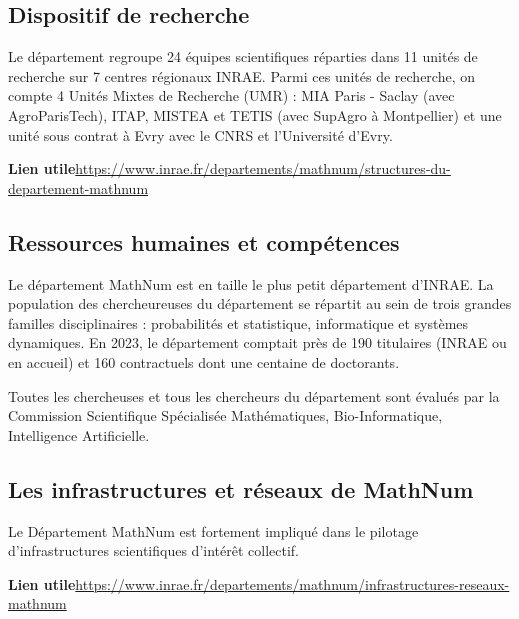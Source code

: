 \subsection{Dispositif de recherche}

Le d\'epartement regroupe 24 \'equipes scientifiques r\'eparties dans 11 unit\'es de recherche sur 7 centres r\'egionaux INRAE. Parmi ces unit\'es de recherche, on compte 4 Unit\'es Mixtes de Recherche (UMR) : MIA Paris - Saclay (avec AgroParisTech), ITAP, MISTEA et TETIS (avec SupAgro \`a Montpellier) et une unit\'e sous contrat \`a Evry avec le CNRS et l'Universit\'e d'Evry.

\textbf{Lien utile\hspace{.5em}}\url{https://www.inrae.fr/departements/mathnum/structures-du-departement-mathnum}

\subsection{Ressources humaines et comp\'etences}

Le d\'epartement MathNum est en taille le plus petit d\'epartement d'INRAE. La population des chercheur\mp euse\mp s du d\'epartement se r\'epartit au sein de trois grandes familles disciplinaires : probabilit\'es et statistique, informatique et syst\`emes dynamiques. En 2023, le d\'epartement comptait pr\`es de 190 titulaires (INRAE ou en accueil) et 160 contractuels dont une centaine de doctorants. 

Toutes les chercheuses et tous les chercheurs du d\'epartement sont \'evalu\'es par la Commission Scientifique Sp\'ecialis\'ee Math\'ematiques, Bio-Informatique, Intelligence Artificielle.

\subsection{Les infrastructures et r\'eseaux de MathNum}

Le Département MathNum est fortement impliqué dans le pilotage d’infrastructures scientifiques d’intérêt collectif.

\textbf{Lien utile\hspace{.5em}}\url{https://www.inrae.fr/departements/mathnum/infrastructures-reseaux-mathnum}



